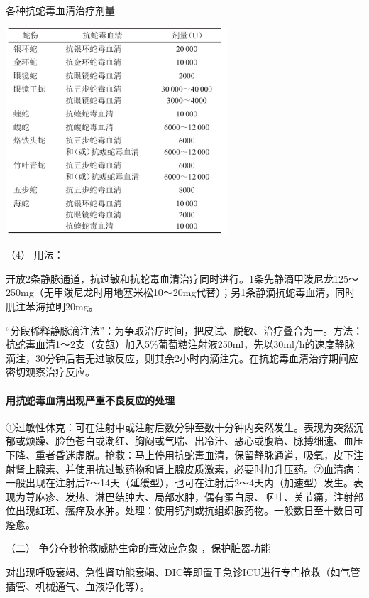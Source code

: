 \begin{table}[htbp]
\centering
\caption{各种抗蛇毒血清治疗剂量}
\label{tab60-5}
\includegraphics[width=3.25in,height=3.04167in]{./images/Image00232.jpg}
\end{table}

\hypertarget{text00172.htmlux5cux23CHP5-8-1-3-3-1-3-4}{}
（4） 用法：

开放2条静脉通道，抗过敏和抗蛇毒血清治疗同时进行。1条先静滴甲泼尼龙125～250mg（无甲泼尼龙时用地塞米松10～20mg代替）；另1条静滴抗蛇毒血清，同时肌注苯海拉明20mg。

“分段稀释静脉滴注法”：为争取治疗时间，把皮试、脱敏、治疗叠合为一。方法：抗蛇毒血清1～2支（安瓿）加入5\%葡萄糖注射液250ml，先以30ml/h的速度静脉滴注，30分钟后若无过敏反应，则其余2小时内滴注完。在抗蛇毒血清治疗期间应密切观察治疗反应。

\paragraph{用抗蛇毒血清出现严重不良反应的处理}

①过敏性休克：可在注射中或注射后数分钟至数十分钟内突然发生。表现为突然沉郁或烦躁、脸色苍白或潮红、胸闷或气喘、出冷汗、恶心或腹痛、脉搏细速、血压下降、重者昏迷虚脱。抢救：马上停用抗蛇毒血清，保留静脉通道，吸氧，皮下注射肾上腺素、并使用抗过敏药物和肾上腺皮质激素，必要时加升压药。②血清病：一般出现在注射后7～14天（延缓型），也可在注射后2～4天内（加速型）发生。表现为荨麻疹、发热、淋巴结肿大、局部水肿，偶有蛋白尿、呕吐、关节痛，注射部位出现红斑、瘙痒及水肿。处理：使用钙剂或抗组织胺药物。一般数日至十数日可痊愈。

\hypertarget{text00172.htmlux5cux23CHP5-8-1-3-3-2}{}
（二） 争分夺秒抢救威胁生命的毒效应危象 ，保护脏器功能

对出现呼吸衰竭、急性肾功能衰竭、DIC等即置于急诊ICU进行专门抢救（如气管插管、机械通气、血液净化等）。

